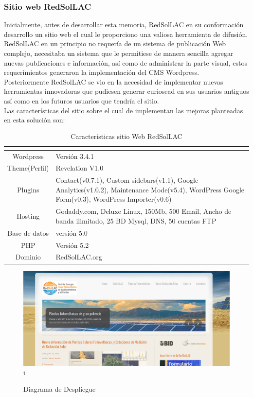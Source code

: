 \subsubsection{Sitio web RedSolLAC}
Inicialmente, antes de desarrollar esta memoria, RedSolLAC en su conformación desarrollo un sitio web el cual le proporciono una valiosa herramienta de difusión. RedSolLAC en un principio no requería de un sistema de publicación Web complejo, necesitaba un sistema que le permitiese de manera sencilla agregar nuevas publicaciones e información, así como de administrar la parte visual, estos requerimientos generaron la implementación del CMS Wordpress.\\
Posteriormente RedSolLAC se vio en la necesidad de implementar nuevas herramientas innovadoras que pudiesen generar curiosead en sus usuarios antiguos así como en los futuros usuarios que tendría el sitio.\\

Las características del sitio sobre el cual de implementan las mejoras planteadas en esta solución son:
\begin{table}[h!]
\caption{Características sitio Web RedSolLAC}
\begin{tabular}{| c | p{11cm} |}
        \hline
        \textbf{}  &       \textbf{}        \\
        \hline
	Wordpress&Versión 3.4.1\\
	\hline
	Theme(Perfil)&Revelation V1.0\\
	\hline
	Plugins&Contact(v0.7.1), Custom sidebars(v1.1), Google Analytics(v1.0.2), Maintenance Mode(v5.4), WordPress Google Form(v0.3), WordPress Importer(v0.6)\\
	\hline
	Hosting&Godaddy.com, Deluxe Linux, 150Mb, 500 Email, Ancho de banda ilimitado, 25 BD Mysql, DNS, 50 cuentas FTP\\
	\hline
	Base de datos&versión 5.0\\
	\hline
	PHP&Versión 5.2\\
	\hline
	Dominio&RedSolLAC.org\\
	\hline
\end{tabular}
\end{table}

\begin{figure}[h!]
        \centering
        \includegraphics[scale=0.4]{images/webRedSolLAC}i
        \caption{Diagrama de Despliegue}
        \label{webRed}
\end{figure}

